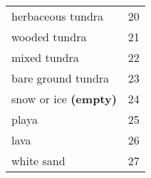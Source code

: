 \begin{table}[htp]
\begin{tabular}{p{7cm} c}
    herbaceous tundra                            & 20  \\
    wooded tundra                                & 21  \\
    mixed tundra                                 & 22  \\
    bare ground tundra                           & 23  \\
    snow or ice \textbf{(empty)}                 & 24  \\
    playa                                        & 25  \\
    lava                                         & 26  \\
    white sand                                   & 27  \\
    \hline
  \end{tabular}
  \label{tab:usgs_surface_type_classifications}
\end{table}

